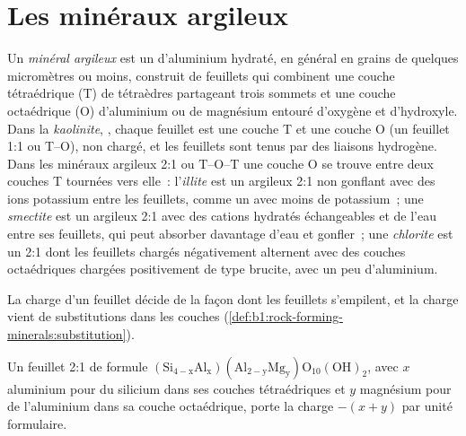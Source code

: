 \section{Les minéraux argileux}\label{sec:b1:weathering-clays:clays}

\begin{definition}\label{def:b1:weathering-clays:clay-mineral}
Un \emph{minéral argileux} est un  d'aluminium hydraté,
en général en grains de quelques micromètres ou moins, construit de
feuillets qui combinent une couche tétraédrique (T) de tétraèdres  partageant
trois sommets et une couche octaédrique (O) d'aluminium ou de magnésium entouré
d'oxygène et d'hydroxyle. Dans la \emph{kaolinite},
, chaque feuillet est une couche T et une couche O (un feuillet 1:1 ou T--O),
non chargé, et les feuillets sont tenus par des liaisons hydrogène. Dans les
minéraux argileux 2:1 ou T--O--T une couche O se trouve entre deux couches T tournées vers elle~:
l'\emph{illite} est un  argileux 2:1 non gonflant avec des ions potassium
entre les feuillets, comme un  avec moins de potassium~;
une \emph{smectite} est un  argileux 2:1 avec des cations hydratés
échangeables et de l'eau entre ses feuillets, qui peut absorber davantage
d'eau et gonfler~; une \emph{chlorite} est un  2:1 dont les
feuillets chargés négativement alternent avec des couches octaédriques chargées positivement
de type brucite,  avec un peu d'aluminium.
\end{definition}

La charge d'un feuillet décide de la façon dont les feuillets s'empilent, et la charge vient de
substitutions dans les couches (\cref{def:b1:rock-forming-minerals:substitution}).

\begin{proposition}\label{prop:b1:weathering-clays:layer-charge}
Un feuillet 2:1 de formule $\mathrm{(Si_{4-x}Al_x)(Al_{2-y}Mg_y)O_{10}(OH)_2}$, avec
$x$ aluminium pour du silicium dans ses couches tétraédriques et $y$ magnésium pour de
l'aluminium dans sa couche octaédrique, porte la charge $-(x + y)$ par unité
formulaire.
\end{proposition}

